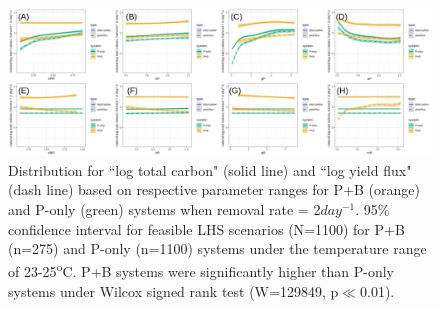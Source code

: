 \documentclass[../thesis.tex]{subfiles} %
\begin{document}
\begin{figure}[H]
    \centering
    \includegraphics[width=\linewidth]{../result/var_20.png}
    \caption[Log carbon distribution for $x=2day^{-1}$ by parameter]{Distribution for ``log total carbon" (solid line) and ``log yield flux" (dash line) based on respective parameter ranges for P+B (orange) and P-only (green) systems when removal rate = 2$day^{-1}$.  {\scriptsize 95\% confidence interval for feasible LHS scenarios (N=1100) for P+B (n=275) and P-only (n=1100) systems under the temperature range of 23-25\textsuperscript{o}C.  P+B systems were significantly higher than P-only systems under Wilcox signed rank test (W=129849, p$\ll$0.01).}}
    \label{fig:v2}
\end{figure}
\end{document}
